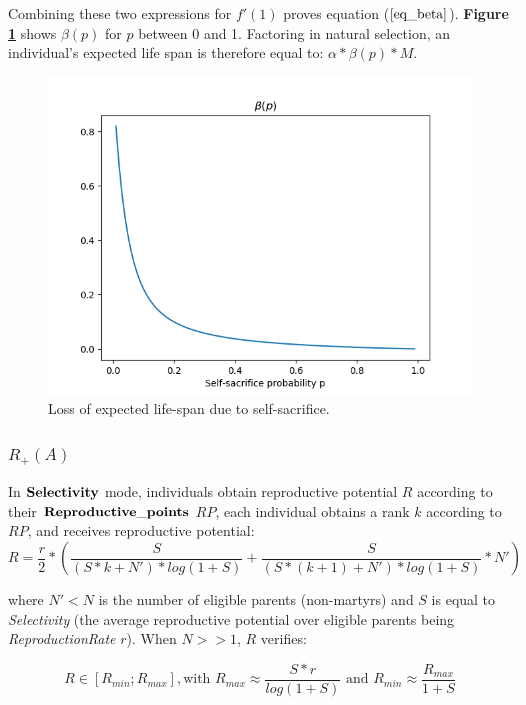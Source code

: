 \documentclass[a4paper,12pt]{article}
\begin{document}
Combining these two expressions for $f'(1)$ proves equation ($\bf\ref{eq_beta}$). \textbf{Figure \ref{fig:beta}} shows
$\beta(p)$ for $p$ between 0 and 1. Factoring in natural selection, an individual's expected life span is therefore equal to: $\alpha*\beta(p)*M$.

\begin{figure}[h]
    \centering
    \includegraphics[width=1\textwidth]{Beta}
    \caption{Loss of expected life-span due to self-sacrifice.}
    \label{fig:beta}
    \end{figure}
    



\subsubsection{$R_{+}(A)$}
\label{ss:R+}
In $\bf{Selectivity}$ mode, individuals obtain reproductive potential $R$ according to their
$\bf{Reproductive\_points}$ $RP$, each individual obtains a rank $k$
according to $RP$, and receives reproductive potential:
\[ R = \frac{r}{2} * (\frac{S}
{(S*k + N')*log(1+S)} + \frac{S}{(S*(k+1) + N')*log(1+S)}*N') \]

where $N'<N$ is the number of eligible parents (non-martyrs) and $S$ is equal to \emph{Selectivity}
(the average reproductive potential over eligible parents being \emph{ReproductionRate} $r$).
When $N >> 1$, $R$ verifies:

\begin{equation}
    R \in [R_{min};R_{max}], \textrm{with } R_{max} \approx \frac{S*r}{log(1+S)} 
    \textrm{ and } R_{min} \approx
    \frac{R_{max}}{1+S}
\label{eq:ReproPot}
\end{equation}
\end{document}

